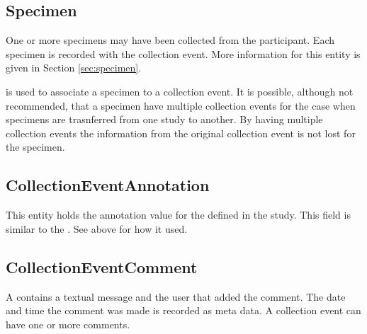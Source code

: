 \subsection*{Specimen}
One or more specimens may have been collected from the participant. Each
specimen is recorded with the collection event. More information for this
entity is given in Section \ref{sec:specimen}.

 is used to associate a specimen to a
collection event. It is possible, although not recommended, that a specimen
have multiple collection events for the case when specimens are trasnferred
from one study to another. By having multiple collection events the information
from the original collection event is not lost for the specimen.

\subsection*{CollectionEventAnnotation}
This entity holds the annotation value for the
 defined in the study. This field
is similar to the . See above for how it used.

\subsection*{CollectionEventComment}
A  contains a textual message and the user
that added the comment. The date and time the comment was made is recorded as
meta data. A collection event can have one or more comments.



